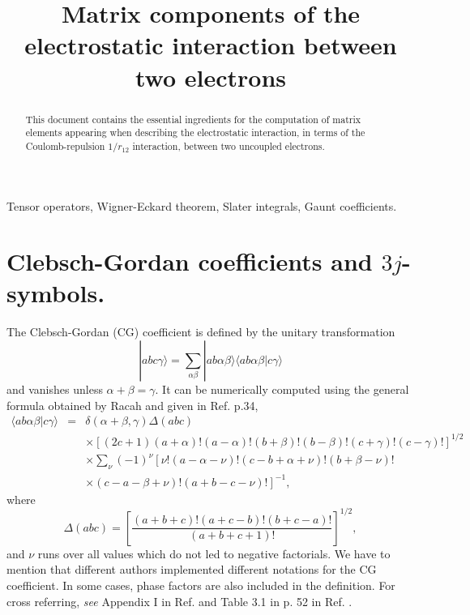 \documentclass[]{interact}
\begin{document}

\title{Matrix components of the electrostatic interaction between two electrons}

\author{
}

\maketitle

\begin{abstract} 
This document contains the essential ingredients for the computation of matrix elements appearing when describing the electrostatic interaction, in terms of the Coulomb-repulsion $1/r_{12}$ interaction, between two uncoupled electrons. 
\end{abstract}

\begin{keywords}
Tensor operators, Wigner-Eckard theorem, Slater integrals, Gaunt coefficients.
\end{keywords}

\section{Clebsch-Gordan coefficients and $3j$-symbols.}

The Clebsch-Gordan (CG) coefficient is defined by the unitary transformation
\begin{equation}
 | abc\gamma \rangle=\sum_{\alpha\beta}|ab\alpha\beta\rangle\langle ab\alpha\beta|c\gamma\rangle
\end{equation}
and vanishes unless $\alpha+\beta=\gamma$. It can be numerically computed using the general formula obtained by Racah and given in Ref. \cite{Brink} p.34,
\begin{equation}
\label{CG}
\begin{array}{rcl}
 \langle ab\alpha\beta|c\gamma\rangle&=&\delta(\alpha+\beta,\gamma)\Delta(abc)\\
 & &\times[(2c+1)(a+\alpha)!(a-\alpha)!(b+\beta)!(b-\beta)!(c+\gamma)!(c-\gamma)!]^{1/2}\\
 & &\times\sum_\nu(-1)^\nu\left[\nu!(a-\alpha-\nu)!(c-b+\alpha+\nu)!(b+\beta-\nu)!\right.\\
 & &\times\left.(c-a-\beta+\nu)!(a+b-c-\nu)!\right]^{-1},
\end{array}
\end{equation}
where 
\begin{equation}
 \Delta(abc)=\left[\frac{(a+b+c)!(a+c-b)!(b+c-a)!}{(a+b+c+1)!}\right]^{1/2},
\end{equation}
and $\nu$ runs over all values which do not led to negative factorials. We have to mention that different authors implemented different notations for the CG coefficient. In some cases, phase factors are also included in the definition. For cross referring, \emph{see} Appendix I in Ref. \cite{Brink} and Table 3.1 in p. 52 in Ref. \cite{Edmonds}.  
\end{document}
